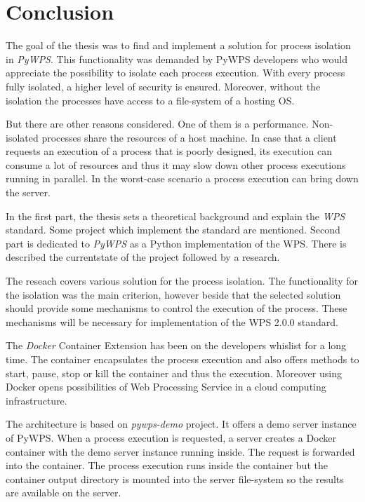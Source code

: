 \documentclass[12pt,a4paper]{article}
\newcommand{\necislovana}[1]{%
\phantomsection
\addcontentsline{toc}{section}{#1}



\section*{#1}
\markboth{\uppercase{#1}}{}
}
\begin{document}
\newpage
\tableofcontents

\newpage
\pagestyle{fancy}









\newpage
\necislovana{Conclusion}
The goal of the thesis was to find and implement a solution for process isolation in \textit{PyWPS}. This functionality was 
demanded by PyWPS developers who would appreciate the possibility to isolate each process execution. With every process 
fully isolated, a higher level of security is ensured. Moreover, without the isolation the processes have access to a 
file-system of a hosting OS.

But there are other reasons considered. One of them is a performance. Non-isolated processes share the resources
of a host machine. In case that a client requests an execution of a process that is poorly designed, its execution
can consume a lot of resources and thus it may slow down other process executions running in parallel. In the 
worst-case scenario a process execution can bring down the server.

In the first part, the thesis sets a theoretical background and explain the \textit{WPS} standard. Some project which implement 
the standard are mentioned. Second part is dedicated to \textit{PyWPS} as a Python implementation of the WPS. There is described 
the currentstate of the project followed by a research.

The reseach covers various solution for the process isolation. The functionality for the isolation was the main
criterion, however beside that the selected solution should provide some mechanisms to control the execution of the
process. These mechanisms will be necessary for implementation of the WPS 2.0.0 standard.

The \textit{Docker} Container Extension has been on the developers whislist for a long time. The container encapsulates the
process execution and also offers methods to start, pause, stop or kill the container and thus the execution. Moreover
using Docker opens possibilities of Web Processing Service in a cloud computing infrastructure.

The architecture is based on \textit{pywps-demo} project. It offers a demo server instance of PyWPS. When a process
execution is requested, a server creates a Docker container with the demo server instance running inside. The request
is forwarded into the container. The process execution runs inside the container but the container output directory is 
mounted into the server file-system so the results are available on the server.
\end{document}
